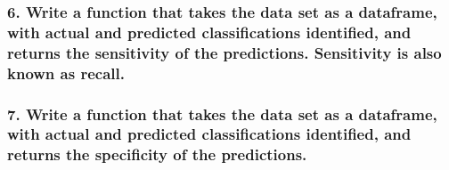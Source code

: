 \documentclass[]{article}
\newenvironment{Shaded}{\begin{snugshade}}{\end{snugshade}}
\newcommand{\KeywordTok}[1]{\textcolor[rgb]{0.13,0.29,0.53}{\textbf{{#1}}}}
\newcommand{\DecValTok}[1]{\textcolor[rgb]{0.00,0.00,0.81}{{#1}}}
\newcommand{\StringTok}[1]{\textcolor[rgb]{0.31,0.60,0.02}{{#1}}}
\newcommand{\NormalTok}[1]{{#1}}
\begin{document}
\subsubsection{6. Write a function that takes the data set as a
dataframe, with actual and predicted classifications identified, and
returns the sensitivity of the predictions. Sensitivity is also known as
recall.}\label{write-a-function-that-takes-the-data-set-as-a-dataframe-with-actual-and-predicted-classifications-identified-and-returns-the-sensitivity-of-the-predictions.-sensitivity-is-also-known-as-recall.}

\begin{Shaded}
\end{Shaded}

\subsubsection{7. Write a function that takes the data set as a
dataframe, with actual and predicted classifications identified, and
returns the specificity of the
predictions.}\label{write-a-function-that-takes-the-data-set-as-a-dataframe-with-actual-and-predicted-classifications-identified-and-returns-the-specificity-of-the-predictions.}

\begin{Shaded}
\end{Shaded}
\end{document}
